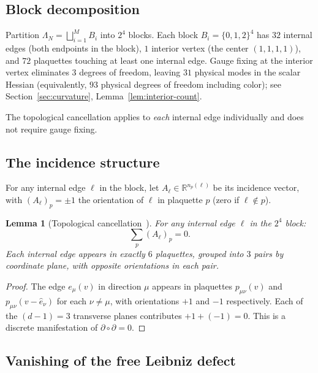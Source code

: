 \documentclass[11pt,a4paper]{article}
\theoremstyle{plain}
\newtheorem{lemma}[theorem]{Lemma}
\theoremstyle{definition}
\theoremstyle{remark}
\newcommand{\R}{\mathbb{R}}
\begin{document}
\subsection{Block decomposition}

Partition $\Lambda_N = \bigsqcup_{i=1}^M B_i$ into $2^4$ blocks.
Each block $B_i = \{0,1,2\}^4$ has $32$ internal edges (both
endpoints in the block), $1$ interior vertex (the center
$(1,1,1,1)$), and $72$ plaquettes touching at least one internal
edge. Gauge fixing at the interior vertex eliminates $3$ degrees of
freedom, leaving $31$ physical modes in the scalar Hessian
(equivalently, $93$ physical degrees of freedom including color);
see Section~\ref{sec:curvature}, Lemma~\ref{lem:interior-count}.

The topological cancellation applies to \emph{each} internal edge
individually and does not require gauge fixing.

\subsection{The incidence structure}

For any internal edge $\ell$ in the block, let
$A_\ell \in \R^{n_p(\ell)}$ be its incidence vector, with
$(A_\ell)_p = \pm 1$ the orientation of $\ell$ in plaquette $p$
(zero if $\ell \notin p$).

\begin{lemma}[Topological cancellation~\cite{Fontes2026h}]\label{lem:cancel}
For any internal edge $\ell$ in the $2^4$ block:
\begin{equation}\label{eq:cancel}
\sum_p (A_\ell)_p = 0.
\end{equation}
Each internal edge appears in exactly $6$ plaquettes, grouped into $3$
pairs by coordinate plane, with opposite orientations in each pair.
\end{lemma}

\begin{proof}
The edge $e_\mu(v)$ in direction $\mu$ appears in plaquettes
$p_{\mu\nu}(v)$ and $p_{\mu\nu}(v - \hat{e}_\nu)$ for each
$\nu \neq \mu$, with orientations $+1$ and $-1$ respectively.
Each of the $(d-1) = 3$ transverse planes contributes $+1 + (-1) = 0$.
This is a discrete manifestation of $\partial \circ \partial = 0$.
\end{proof}

\subsection{Vanishing of the free Leibniz defect}
\end{document}
